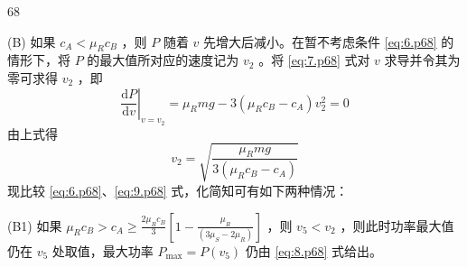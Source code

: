 \begin{solution}{68}
\begin{subsolution}
        (B) 如果 $c_{A} < \mu_{R} c_{B}$ ，则 $P$ 随着 $v$ 先增大后减小。在暂不考虑条件 \eqref{eq:6.p68} 的情形下，将 $P$ 的最大值所对应的速度记为 $v_{2}$ 。将 \eqref{eq:7.p68} 式对 $v$ 求导并令其为零可求得 $v_{2}$ ，即
        \begin{equation*}
            \left.\frac{\mathrm{d}P}{\mathrm{d}v}\right|_{v=v_{2}} = \mu_{R} mg - 3(\mu_{R} c_{B} - c_{A}) v_{2}^{2} = 0
        \end{equation*}
        由上式得
        \begin{equation}
            v_{2} = \sqrt{\frac{\mu_{R} mg}{3(\mu_{R} c_{B} - c_{A})}} \label{eq:9.p68}
        \end{equation}
        现比较 \eqref{eq:6.p68}、\eqref{eq:9.p68} 式，化简知可有如下两种情况：

        (B1) 如果 $\mu_{R} c_{B} > c_{A} \geq \frac{2\mu_{R} c_{B}}{3}\left[1 - \frac{\mu_{R}}{(3\mu_{S} - 2\mu_{R})}\right]$ ，则 $v_{5} < v_{2}$ ，则此时功率最大值仍在 $v_{5}$ 处取值，最大功率 $P_{\max} = P(v_{5})$ 仍由 \eqref{eq:8.p68} 式给出。


\end{subsolution}
\end{solution}
